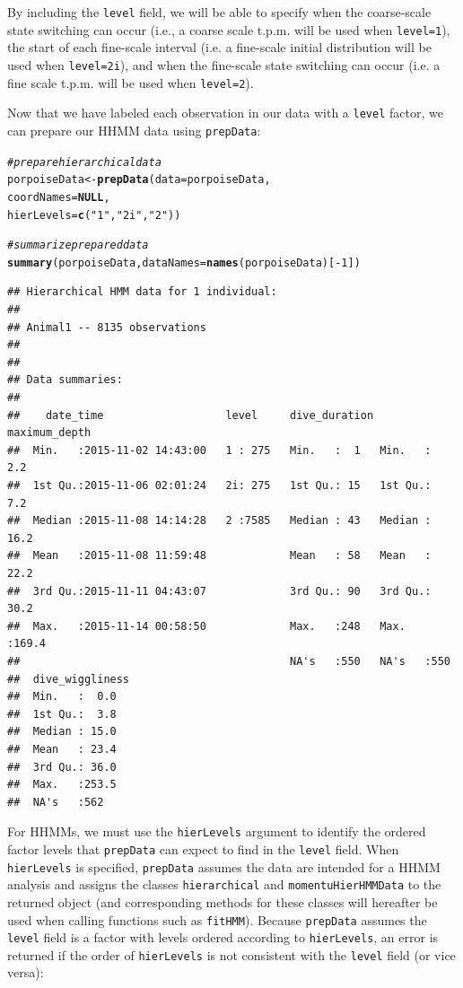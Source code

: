 \documentclass[12pt]{article}\usepackage[]{graphicx}\usepackage[]{xcolor}
\makeatletter
\newcommand{\hlnum}[1]{\textcolor[rgb]{0.686,0.059,0.569}{#1}}%
\newcommand{\hlsng}[1]{\textcolor[rgb]{0.192,0.494,0.8}{#1}}%
\newcommand{\hlcom}[1]{\textcolor[rgb]{0.678,0.584,0.686}{\textit{#1}}}%
\newcommand{\hlopt}[1]{\textcolor[rgb]{0,0,0}{#1}}%
\newcommand{\hldef}[1]{\textcolor[rgb]{0.345,0.345,0.345}{#1}}%
\newcommand{\hlkwa}[1]{\textcolor[rgb]{0.161,0.373,0.58}{\textbf{#1}}}%
\newcommand{\hlkwb}[1]{\textcolor[rgb]{0.69,0.353,0.396}{#1}}%
\newcommand{\hlkwc}[1]{\textcolor[rgb]{0.333,0.667,0.333}{#1}}%
\newcommand{\hlkwd}[1]{\textcolor[rgb]{0.737,0.353,0.396}{\textbf{#1}}}%
\newenvironment{kframe}{%
 \def\at@end@of@kframe{}%
 \ifinner\ifhmode%
  \def\at@end@of@kframe{\end{minipage}}%
  \begin{minipage}{\columnwidth}%
 \fi\fi%
 \def\FrameCommand##1{\hskip\@totalleftmargin \hskip-\fboxsep
 \colorbox{shadecolor}{##1}\hskip-\fboxsep
     \hskip-\linewidth \hskip-\@totalleftmargin \hskip\columnwidth}%
 \MakeFramed {\advance\hsize-\width
   \@totalleftmargin\z@ \linewidth\hsize
   \@setminipage}}%
 {\par\unskip\endMakeFramed%
 \at@end@of@kframe}
\newenvironment{knitrout}{}{} %
\makeatother
\begin{document}
\noindent By including the \verb|level| field, we will be able to specify when the coarse-scale state switching can occur (i.e., a coarse scale t.p.m. will be used when \verb|level=1|), the start of each fine-scale interval (i.e. a fine-scale initial distribution will be used when \verb|level=2i|), and when the fine-scale state switching can occur (i.e. a fine scale t.p.m. will be used when \verb|level=2|).

Now that we have labeled each observation in our data with a \verb|level| factor, we can prepare our HHMM data using \verb|prepData|:
\begin{knitrout}
\color{fgcolor}\begin{kframe}
\begin{alltt}
\hlcom{# prepare hierarchical data}
\hldef{porpoiseData} \hlkwb{<-} \hlkwd{prepData}\hldef{(}\hlkwc{data} \hldef{= porpoiseData,}
                         \hlkwc{coordNames} \hldef{=} \hlkwa{NULL}\hldef{,}
                         \hlkwc{hierLevels} \hldef{=} \hlkwd{c}\hldef{(}\hlsng{"1"}\hldef{,} \hlsng{"2i"}\hldef{,} \hlsng{"2"}\hldef{))}

\hlcom{# summarize prepared data}
\hlkwd{summary}\hldef{(porpoiseData,} \hlkwc{dataNames} \hldef{=} \hlkwd{names}\hldef{(porpoiseData)[}\hlopt{-}\hlnum{1}\hldef{])}
\end{alltt}
\begin{verbatim}
## Hierarchical HMM data for 1 individual:
## 
## Animal1 -- 8135 observations
## 
## 
## Data summaries:
## 
##    date_time                   level     dive_duration maximum_depth  
##  Min.   :2015-11-02 14:43:00   1 : 275   Min.   :  1   Min.   :  2.2  
##  1st Qu.:2015-11-06 02:01:24   2i: 275   1st Qu.: 15   1st Qu.:  7.2  
##  Median :2015-11-08 14:14:28   2 :7585   Median : 43   Median : 16.2  
##  Mean   :2015-11-08 11:59:48             Mean   : 58   Mean   : 22.2  
##  3rd Qu.:2015-11-11 04:43:07             3rd Qu.: 90   3rd Qu.: 30.2  
##  Max.   :2015-11-14 00:58:50             Max.   :248   Max.   :169.4  
##                                          NA's   :550   NA's   :550    
##  dive_wiggliness
##  Min.   :  0.0  
##  1st Qu.:  3.8  
##  Median : 15.0  
##  Mean   : 23.4  
##  3rd Qu.: 36.0  
##  Max.   :253.5  
##  NA's   :562
\end{verbatim}
\end{kframe}
\end{knitrout}
\noindent For HHMMs, we must use the \verb|hierLevels| argument to identify the ordered factor levels that \verb|prepData| can expect to find in the \verb|level| field. When \verb|hierLevels| is specified, \verb|prepData| assumes the data are intended for a HHMM analysis and assigns the classes \verb|hierarchical| and \verb|momentuHierHMMData| to the returned object (and corresponding methods for these classes will hereafter be used when calling functions such as \verb|fitHMM|). Because \verb|prepData| assumes the \verb|level| field is a factor with levels ordered according to \verb|hierLevels|, an error is returned if the order of \verb|hierLevels| is not consistent with the \verb|level| field (or vice versa): 
\end{document}
